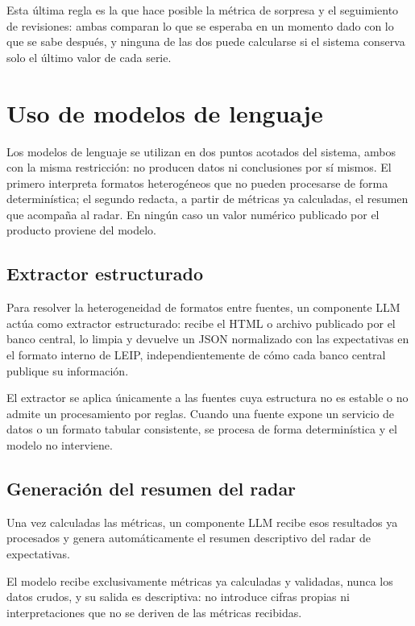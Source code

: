 \documentclass[11pt,a4paper]{article}
\newcommand{\proyectoNombre}{LEIP}
\begin{document}
Esta \'ultima regla es la que hace posible la m\'etrica de sorpresa y el
seguimiento de revisiones: ambas comparan lo que se esperaba en un momento dado
con lo que se sabe despu\'es, y ninguna de las dos puede calcularse si el
sistema conserva solo el \'ultimo valor de cada serie.

\section{Uso de modelos de lenguaje}

Los modelos de lenguaje se utilizan en dos puntos acotados del sistema, ambos
con la misma restricci\'on: no producen datos ni conclusiones por s\'i mismos.
El primero interpreta formatos heterog\'eneos que no pueden procesarse de forma
determin\'istica; el segundo redacta, a partir de m\'etricas ya calculadas, el
resumen que acompa\~na al radar. En ning\'un caso un valor num\'erico publicado
por el producto proviene del modelo.

\subsection{Extractor estructurado}

Para resolver la heterogeneidad de formatos entre fuentes, un componente LLM
act\'ua como extractor estructurado: recibe el HTML o archivo publicado
por el banco central, lo limpia y devuelve un JSON normalizado con las
expectativas en el formato interno de \proyectoNombre{}, independientemente de
c\'omo cada banco central publique su informaci\'on.

El extractor se aplica \'unicamente a las fuentes cuya estructura no es estable
o no admite un procesamiento por reglas. Cuando una fuente expone un servicio de
datos o un formato tabular consistente, se procesa de forma determin\'istica y
el modelo no interviene.

\subsection{Generaci\'on del resumen del radar}

Una vez calculadas las m\'etricas, un componente LLM recibe esos resultados ya
procesados y genera autom\'aticamente el resumen descriptivo del radar de
expectativas.

El modelo recibe exclusivamente m\'etricas ya calculadas y validadas, nunca los
datos crudos, y su salida es descriptiva: no introduce cifras propias ni
interpretaciones que no se deriven de las m\'etricas recibidas.
\end{document}
